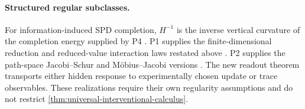 \paragraph{Structured regular subclasses.}
For information-induced SPD completion, $H^{-1}$ is the inverse vertical curvature of the completion energy supplied by P4 \citep{li2026informationinducedgeometry}.  P1 supplies the finite-dimensional reduction and reduced-value interaction laws restated above \citep{li2026optimizationgeometrodynamics}.  P2 supplies the path-space Jacobi--Schur and M\"obius--Jacobi versions \citep{li2026restrictedcomplexity}.  The new readout theorem transports either hidden response to experimentally chosen update or trace observables.  These realizations require their own regularity assumptions and do not restrict \cref{thm:universal-interventional-calculus}.
